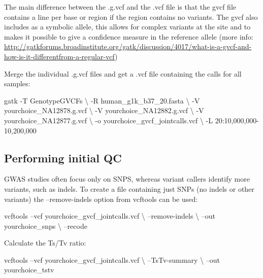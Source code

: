 \documentclass[]{book}
\newenvironment{Shaded}{\begin{snugshade}}{\end{snugshade}}
\newcommand{\ExtensionTok}[1]{#1}
\newcommand{\NormalTok}[1]{#1}
\begin{document}
The main difference between the .g.vcf and the .vcf file is that the
gvcf file contains a line per base or region if the region contains no
variants. The gvcf also includes as a symbolic allele, this allows for
complex variants at the site and to makes it possible to give a
confidence measure in the reference allele (more info:
\url{http://gatkforums.broadinstitute.org/gatk/discussion/4017/what-is-a-gvcf-and-how-is-it-differentfrom-a-regular-vcf})

Merge the individual .g.vcf files and get a .vcf file containing the
calls for all samples:

\begin{Shaded}
\begin{Highlighting}[]
\ExtensionTok{gatk}\NormalTok{ -T GenotypeGVCFs \textbackslash{}}
\NormalTok{-R human_g1k_b37_20.fasta \textbackslash{}}
\NormalTok{-V yourchoice_NA12878.g.vcf \textbackslash{}}
\NormalTok{-V yourchoice_NA12882.g.vcf \textbackslash{}}
\NormalTok{-V yourchoice_NA12877.g.vcf \textbackslash{}}
\NormalTok{-o yourchoice_gvcf_jointcalls.vcf \textbackslash{}}
\NormalTok{-L 20:10,000,000-10,200,000}
\end{Highlighting}
\end{Shaded}

\subsection{Performing initial QC}\label{performing-initial-qc}

GWAS studies often focus only on SNPS, whereas variant callers identify
more variants, such as indels. To create a file containing just SNPs (no
indels or other variants) the --remove-indels option from vcftools can
be used:

\begin{Shaded}
\begin{Highlighting}[]
\ExtensionTok{vcftools}\NormalTok{ --vcf yourchoice_gvcf_jointcalls.vcf \textbackslash{}}
\NormalTok{--remove-indels \textbackslash{}}
\NormalTok{--out yourchoice_snps \textbackslash{}}
\NormalTok{--recode}
\end{Highlighting}
\end{Shaded}

Calculate the Ts/Tv ratio:

\begin{Shaded}
\begin{Highlighting}[]
\ExtensionTok{vcftools}\NormalTok{ --vcf yourchoice_gvcf_jointcalls.vcf \textbackslash{}}
\NormalTok{--TsTv-summary \textbackslash{}}
\NormalTok{--out yourchoice_tstv}
\end{Highlighting}
\end{Shaded}
\end{document}
